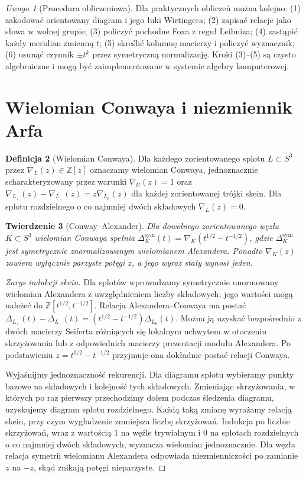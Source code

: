 \documentclass[11pt,a4paper]{report}
\numberwithin{equation}{section}
\theoremstyle{plain}
\newtheorem{twierdzenie}{Twierdzenie}[section]
\theoremstyle{definition}
\newtheorem{definicja}[twierdzenie]{Definicja}
\theoremstyle{remark}
\newtheorem{uwaga}[twierdzenie]{Uwaga}
\begin{document}
\begin{uwaga}[Procedura obliczeniowa]
Dla praktycznych obliczeń można kolejno:
(1) zakodować orientowany diagram i jego łuki Wirtingera;
(2) zapisać relacje jako słowa w wolnej grupie;
(3) policzyć pochodne Foxa z reguł Leibniza;
(4) zastąpić każdy meridian zmienną $t$;
(5) skreślić kolumnę macierzy i policzyć wyznacznik;
(6) usunąć czynnik $\pm t^k$ przez symetryczną normalizację.
Kroki (3)--(5) są czysto algebraiczne i mogą być
zaimplementowane w systemie algebry komputerowej.
\end{uwaga}

\section{Wielomian Conwaya i niezmiennik Arfa}
\label{sec:kt-conway-arf}

\begin{definicja}[Wielomian Conwaya]
Dla każdego zorientowanego splotu $L\subset S^3$
przez $\nabla_L(z)\in\mathbb Z[z]$ oznaczamy
wielomian Conwaya, jednoznacznie scharakteryzowany
przez warunki $\nabla_U(z)=1$ oraz
$\nabla_{L_+}(z)-\nabla_{L_-}(z)=z\nabla_{L_0}(z)$
dla każdej zorientowanej trójki skein. Dla splotu
rozdzielnego o co najmniej dwóch składowych
$\nabla_L(z)=0$.
\end{definicja}

\begin{twierdzenie}[Conway--Alexander]
Dla dowolnego zorientowanego węzła $K\subset S^3$
wielomian Conwaya spełnia
$\Delta_K^{\mathrm{sym}}(t)=
\nabla_K(t^{1/2}-t^{-1/2})$,
gdzie $\Delta_K^{\mathrm{sym}}$ jest symetrycznie
znormalizowanym wielomianem Alexandera.
Ponadto $\nabla_K(z)$ zawiera wyłącznie parzyste
potęgi $z$, a jego wyraz stały wynosi jeden.
\end{twierdzenie}

\begin{proof}[Zarys indukcji skein]
Dla splotów wprowadzamy symetrycznie unormowany wielomian
Alexandera z uwzględnieniem liczby składowych; jego wartości
mogą należeć do $\mathbb Z[t^{1/2},t^{-1/2}]$. Relacja
Alexandera--Conwaya ma postać
$\Delta_{L_+}(t)-\Delta_{L_-}(t)=
(t^{1/2}-t^{-1/2})\Delta_{L_0}(t)$.
Można ją uzyskać bezpośrednio z dwóch macierzy Seiferta
różniących się lokalnym uchwytem w otoczeniu skrzyżowania
lub z odpowiednich macierzy prezentacji modułu Alexandera.
Po podstawieniu $z=t^{1/2}-t^{-1/2}$ przyjmuje ona dokładnie
postać relacji Conwaya.

Wyjaśnijmy jednoznaczność rekurencji. Dla diagramu splotu
wybieramy punkty bazowe na składowych i kolejność tych
składowych. Zmieniając skrzyżowania, w których po raz
pierwszy przechodzimy dołem podczas śledzenia diagramu,
uzyskujemy diagram splotu rozdzielnego. Każdą taką zmianę
wyrażamy relacją skein, przy czym wygładzenie zmniejsza
liczbę skrzyżowań. Indukcja po liczbie skrzyżowań, wraz
z wartością $1$ na węźle trywialnym i $0$ na splotach
rozdzielnych o co najmniej dwóch składowych, wyznacza
wielomian jednoznacznie. Dla węzła relacja symetrii
wielomianu Alexandera odpowiada niezmienniczości po
zamianie $z$ na $-z$, skąd znikają potęgi nieparzyste.
\end{proof}
\end{document}
